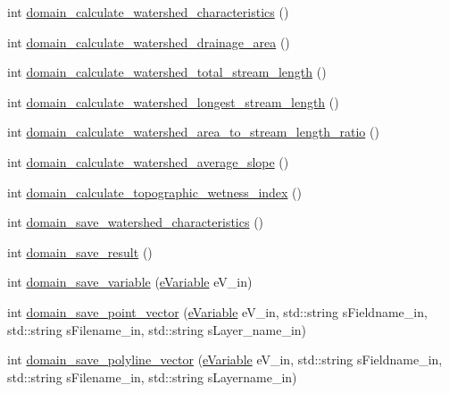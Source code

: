 \begin{DoxyCompactItemize}
\item 
int \hyperlink{classhexwatershed_1_1domain_aa1226d5aabd18a3f8edee1d086375270}{domain\-\_\-calculate\-\_\-watershed\-\_\-characteristics} ()
\item 
int \hyperlink{classhexwatershed_1_1domain_ad0460cce308bf46b551a28fb11d34391}{domain\-\_\-calculate\-\_\-watershed\-\_\-drainage\-\_\-area} ()
\item 
int \hyperlink{classhexwatershed_1_1domain_a4f91911114897b85ecca3ddcc2a6ad3d}{domain\-\_\-calculate\-\_\-watershed\-\_\-total\-\_\-stream\-\_\-length} ()
\item 
int \hyperlink{classhexwatershed_1_1domain_a115ef97c3418382592a2390b766f4a7b}{domain\-\_\-calculate\-\_\-watershed\-\_\-longest\-\_\-stream\-\_\-length} ()
\item 
int \hyperlink{classhexwatershed_1_1domain_affc80ad3c171da254eba12ddf7fc9ad7}{domain\-\_\-calculate\-\_\-watershed\-\_\-area\-\_\-to\-\_\-stream\-\_\-length\-\_\-ratio} ()
\item 
int \hyperlink{classhexwatershed_1_1domain_ac22d45a58ed1063b9a45f3a79893f45e}{domain\-\_\-calculate\-\_\-watershed\-\_\-average\-\_\-slope} ()
\item 
int \hyperlink{classhexwatershed_1_1domain_a81ada0020ec3c991a858a01a72d2c294}{domain\-\_\-calculate\-\_\-topographic\-\_\-wetness\-\_\-index} ()
\item 
int \hyperlink{classhexwatershed_1_1domain_acf500c397baf2a54c510506f4e4a71e6}{domain\-\_\-save\-\_\-watershed\-\_\-characteristics} ()
\item 
int \hyperlink{classhexwatershed_1_1domain_a01b8063b356024ed131bbc98c24f8d87}{domain\-\_\-save\-\_\-result} ()
\item 
int \hyperlink{classhexwatershed_1_1domain_aee3a9cae14f5d4a4a95733888aaceb56}{domain\-\_\-save\-\_\-variable} (\hyperlink{domain_8h_aab5e06ddc3c042f4ed3acef47abe0b24}{e\-Variable} e\-V\-\_\-in)
\item 
int \hyperlink{classhexwatershed_1_1domain_a883af7b812dda18a89114cafd62d8666}{domain\-\_\-save\-\_\-point\-\_\-vector} (\hyperlink{domain_8h_aab5e06ddc3c042f4ed3acef47abe0b24}{e\-Variable} e\-V\-\_\-in, std\-::string s\-Fieldname\-\_\-in, std\-::string s\-Filename\-\_\-in, std\-::string s\-Layer\-\_\-name\-\_\-in)
\item 
int \hyperlink{classhexwatershed_1_1domain_ad019c4b9bbcb194f1411b4273a561b66}{domain\-\_\-save\-\_\-polyline\-\_\-vector} (\hyperlink{domain_8h_aab5e06ddc3c042f4ed3acef47abe0b24}{e\-Variable} e\-V\-\_\-in, std\-::string s\-Fieldname\-\_\-in, std\-::string s\-Filename\-\_\-in, std\-::string s\-Layername\-\_\-in)

\end{DoxyCompactItemize}
